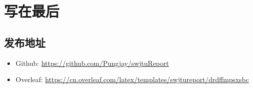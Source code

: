 \section{写在最后}
\subsection{发布地址}
\begin{itemize}
    \item Github: 
    \url{https://github.com/Pungjay/swjtuReport}
    \item Overleaf:  \url{https://cn.overleaf.com/latex/templates/swjtureport/drdffmpsxsbc}
\end{itemize}